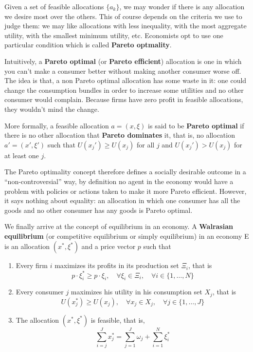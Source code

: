 Given a set of feasible allocations $\{a_k\}$, we may wonder if there is any allocation we desire most over the others. This of course depends on the criteria we use to judge them: we may like allocations with less inequality, with the most aggregate utility, with the smallest minimum utility, etc. Economists opt to use one particular condition which is called \textbf{Pareto optmality}.

Intuitively, a \textbf{Pareto optimal} (or \textbf{Pareto efficient}) allocation is one in which you can't make a consumer better without making another consumer worse off. The idea is that, a non Pareto optimal allocation has some waste in it: one could change the consumption bundles in order to increase some utilities and no other consumer would complain. Because firms have zero profit in feasible allocations, they wouldn't mind the change. 

More formally, a feasible allocation $a = (x, \xi)$ is said to be \textbf{Pareto optimal} if there is no other allocation that \textbf{Pareto dominates} it, that is, no allocation $a' = (x', \xi')$ such that $U(x_j') \geq U(x_j)$ for all $j$ and $U(x_j') > U(x_j)$ for at least one $j$.

The Pareto optimality concept therefore defines a socially desirable outcome in a ``non-controversial'' way, by definition no agent in the economy would have a problem with policies or actions taken to make it more Pareto efficient. However, it says nothing about equality: an allocation in which one consumer has all the goods and no other consumer has any goods is Pareto optimal.

We finally arrive at the concept of equilibrium in an economy. A \textbf{Walrasian equilibrium} (or competitive equilibrium or simply equilibrium) in an economy E is an allocation $(x^\ast, \xi^\ast)$ and a price vector $p$ such that

\begin{enumerate}
\item Every firm $i$ maximizes its profits in its production set
  $\Xi_i$, that is
  \begin{equation}
    \label{eq:GET_4}
    p\cdot \xi_i^\ast \geq p\cdot \xi_i, \quad \forall \xi_i \in
    \Xi_i,\quad \forall i \in \{1, \ldots, N\} 
  \end{equation}
\item Every consumer $j$ maximizes his utility in his consumption set
  $X_j$, that is
  \begin{equation}
    \label{eq:GET_1}
    U(x_j^\ast) \geq U(x_j), \quad \forall x_j \in X_j, \quad \forall
    j \in \{1,\ldots, J\}
  \end{equation}
\item The allocation $(x^\ast, \xi^\ast)$ is feasible, that is,
  \begin{equation}
    \label{eq:GET_2}
    \sum_{i=j}^J x_j^\ast = \sum_{j=1}^J \omega_j + \sum_{i=1}^N \xi_i^\ast
  \end{equation}
\end{enumerate}

